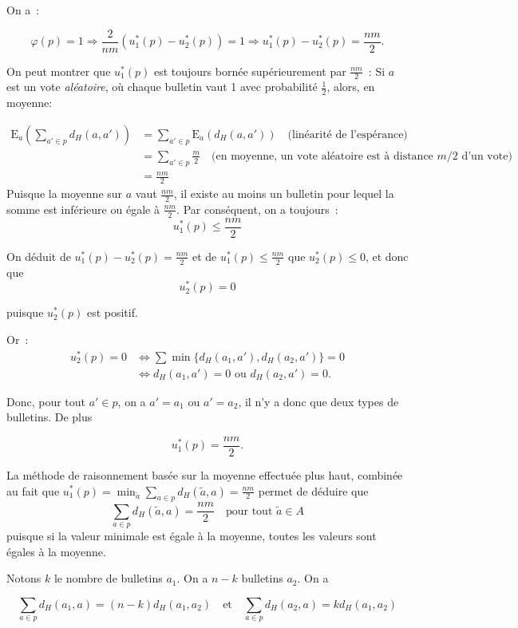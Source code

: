 \documentclass[11pt]{article}
\begin{document}
On a~:

\[
\varphi(p) = 1 
\Rightarrow \frac{2}{n m}(u_1^*(p) - u_2^*(p)) = 1 
\Rightarrow u_1^*(p) - u_2^*(p) = \frac{n m}{2}.
\]

On peut montrer que $u_1^*(p)$ est toujours bornée supérieurement par $\frac{nm}{2}$~: 
Si $a$ est un vote \emph{aléatoire}, où chaque bulletin vaut 1 avec probabilité $\frac12$, alors, en moyenne:

\begin{align*}
\text{E}_a \left( \sum_{a' \in p} d_H(a,a') \right)
&=
\sum_{a' \in p} \text{E}_a \left( d_H(a,a') \right) \quad \text{(linéarité de l'espérance)}\\
&=
\sum_{a' \in p} \frac{m}{2} \quad \text{(en moyenne, un vote aléatoire est à distance $m/2$ d'un vote)}\\
&=
\frac{nm}{2}
\end{align*}
Puisque la moyenne sur $a$ vaut $\frac{nm}{2}$, il existe au moins un bulletin pour lequel la somme est inférieure ou égale à $\frac{nm}{2}$. Par conséquent, on a toujours~:
\[
u_1^*(p) \le \frac{nm}{2}
\]

On déduit de $u_1^*(p) - u_2^*(p) = \frac{n m}{2}$ et de $u_1^*(p) \le \frac{nm}{2}$ que $u_2^*(p) \le 0$, et donc que 
\[
u_2^*(p) = 0
\]

puisque $u_2^*(p)$ est positif.

Or~:
\begin{align*}
u_2^*(p) = 0 
&\Leftrightarrow 
\sum \min \{d_H(a_1,a'), d_H(a_2,a')\} = 0\\
&\Leftrightarrow 
d_H(a_1,a') = 0 \text{ ou } d_H(a_2,a') = 0.
\end{align*}

Donc, pour tout $a' \in p$, on a $a' = a_1$ ou $a' = a_2$, il n’y a donc que deux types de bulletins. De plus 

\[
u_1^*(p) = \frac{n m}{2}.
\]

La méthode de raisonnement basée sur la moyenne effectuée plus haut, combinée au fait que $u_1^*(p) = \min_{\tilde{a}} \sum_{a \in p} d_H(\tilde{a},a) = \frac{n m}{2}$ permet de déduire que 
\[
\sum_{a \in p} d_H(\tilde{a},a) = \frac{n m}{2}
\quad
\text{pour tout $\tilde{a} \in A$}
\]
puisque si la valeur minimale est égale à la moyenne, toutes les valeurs sont égales à la moyenne.

Notons $k$ le nombre de bulletins $a_1$. On a $n-k$ bulletins $a_2$. On a

\[
\sum_{a \in p} d_H(a_1,a) = (n-k) d_H(a_1,a_2)
\quad\text{et}\quad
\sum_{a \in p} d_H(a_2,a) = k d_H(a_1,a_2)
\]
\end{document}
